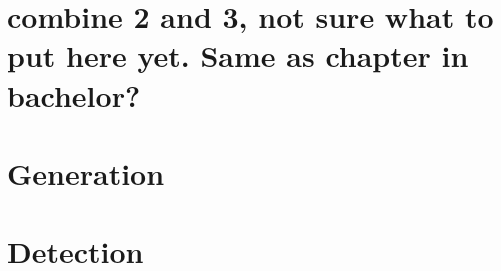 \section{combine 2 and 3, not sure what to put here yet. Same as chapter in bachelor?}

\section{Generation}

\section{Detection}